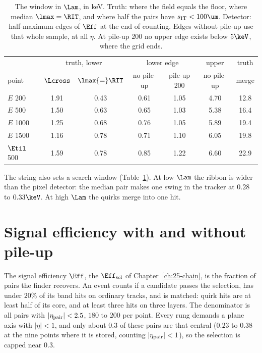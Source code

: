 \begin{table}[!t]
  \caption{The window in $\Lam$, in keV. Truth: where the field equals the floor, where median $\lmax=\RIT$, and where half the pairs have
  $s_{\rm IT}<100\um$. Detector: half-maximum edges of $\Eff$ at the end of counting. Edges without pile-up use that whole sample, at all $\eta$. At pile-up 200 no upper edge exists below $5\keV$, where the grid ends.}
  \label{tab:26-window}
  \small\setlength{\tabcolsep}{4pt}
  \begin{tabular}{lcccccc}
    \toprule
    & \multicolumn{2}{c}{truth, lower} & \multicolumn{2}{c}{lower edge} & upper & truth\\
    point & $\Lcross$ & $\lmax{=}\RIT$ & no pile-up & pile-up 200 & no pile-up & merge\\
    \midrule
    $E$ 200 & 1.91 & 0.43 & 0.61 & 1.05 & 4.70 & 12.8\\
    $E$ 500 & 1.50 & 0.63 & 0.65 & 1.03 & 5.38 & 16.4\\
    $E$ 1000 & 1.25 & 0.68 & 0.76 & 1.05 & 5.89 & 19.4\\
    $E$ 1500 & 1.16 & 0.78 & 0.71 & 1.10 & 6.05 & 19.8\\
    $\Etil$ 500 & 1.59 & 0.78 & 0.85 & 1.22 & 6.60 & 22.9\\
    \bottomrule
  \end{tabular}
\end{table}

The string also sets a search window (Table~\ref{tab:26-window}). At low $\Lam$ the ribbon is wider than the pixel detector: the median pair
makes one swing in the tracker at $0.28$ to $0.33\keV$. At high $\Lam$ the quirks merge into one hit.

\section{Signal efficiency with and without pile-up}\label{sec:26-eff}

The signal efficiency $\Eff$, the $\Eff_{\rm sel}$ of Chapter~\ref{ch:25-chain}, is the fraction of pairs the finder recovers. An event counts if a candidate passes the selection, has under $20\%$ of its band hits on ordinary tracks, and is
matched: quirk hits are at least half of its core, and at least three hits on three layers. The denominator is all pairs
with $|\eta_{\rm pair}|<2.5$, $180$ to $200$ per point. Every rung demands a plane axis with $|\eta|<1$, and only about $0.3$ of these pairs are that central ($0.23$ to $0.38$ at the nine points where it is stored, counting $|\eta_{\rm pair}|<1$), so the selection is capped near $0.3$.

